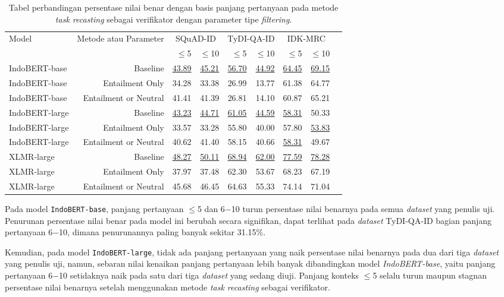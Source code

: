 \begin{table}[H]\centering
\small
\begin{tabular}{lrrrrrrrr}\toprule
\multirow{2}{*}{Model} &\multirow{2}{*}{Metode atau Parameter} &\multicolumn{2}{c}{SQuAD-ID} &\multicolumn{2}{c}{TyDI-QA-ID} &\multicolumn{2}{c}{IDK-MRC} \\\cmidrule{3-8}
& &$\leq$5 &$\leq$10 &$\leq$5 &$\leq$10 &$\leq$5 &$\leq$10 \\\midrule
IndoBERT-base &Baseline &\underline{43.89} &\underline{45.21} &\underline{56.70} &\underline{44.92} &\underline{64.45} &\underline{69.15} \\
IndoBERT-base &Entailment Only &34.28 &33.38 &26.99 &13.77 &61.38 &64.77 \\
IndoBERT-base &Entailment or Neutral &41.41 &41.39 &26.81 & 14.10&60.87 &65.21 \\
\hline
IndoBERT-large &Baseline &\underline{43.23} &\underline{44.71} &\underline{61.05} &\underline{44.59} &\underline{58.31} &50.33 \\
IndoBERT-large &Entailment Only &33.57 &33.28 &55.80 &40.00 &57.80 &\underline{53.83} \\
IndoBERT-large &Entailment or Neutral &40.62 &41.40 &58.15 &40.66 &\underline{58.31} &49.67 \\
\hline
XLMR-large &Baseline &\underline{48.27} &\underline{50.11} &\underline{68.94} &\underline{62.00} &\underline{77.59} &\underline{78.28} \\
XLMR-large &Entailment Only &37.97 &37.48 &62.30 &53.67 &68.23 &67.19 \\
XLMR-large &Entailment or Neutral &45.68 &46.45 &64.63 &55.33 &74.14 &71.04 \\
\bottomrule
\end{tabular}
\caption{Tabel perbandingan persentase nilai benar dengan basis panjang pertanyaan pada metode \emph{task recasting} sebagai verifikator dengan parameter tipe \emph{filtering}.}
\end{table}

Pada model \texttt{IndoBERT-base}, panjang pertanyaan $\leq$5 dan 6$-$10 turun persentase nilai benarnya pada semua \emph{dataset} yang penulis uji. Penurunan persentase nilai benar pada model ini berubah secara signifikan, dapat terlihat pada \emph{dataset} TyDI-QA-ID bagian panjang pertanyaan 6$-$10, dimana penurunannya paling banyak sekitar 31.15\%.

Kemudian, pada model \texttt{IndoBERT-large}, tidak ada panjang pertanyaan yang naik persentase nilai benarnya pada dua dari tiga \emph{dataset} yang penulis uji, namun, sebaran nilai kenaikan panjang pertanyaan lebih banyak dibandingkan model \emph{IndoBERT-base}, yaitu panjang pertanyaan  6$-$10 setidaknya naik pada satu dari tiga \emph{dataset} yang sedang diuji. Panjang konteks  $\leq$5 selalu turun maupun stagnan persentase nilai benarnya setelah menggunakan metode \emph{task recasting} sebagai verifikator.

